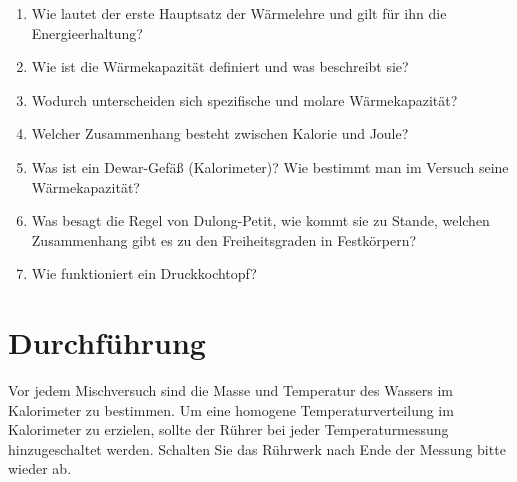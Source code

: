 \begin{enumerate} 
 \item Wie lautet der erste Hauptsatz der Wärmelehre und gilt für ihn die Energieerhaltung?
 \item Wie ist die Wärmekapazität definiert und was beschreibt sie?
 \item Wodurch unterscheiden sich spezifische und molare Wärmekapazität?
 \item Welcher Zusammenhang besteht zwischen Kalorie und Joule?
 \item Was ist ein Dewar-Gefäß (Kalorimeter)? Wie bestimmt man im Versuch seine Wärmekapazität?
 \item Was besagt die Regel von Dulong-Petit, wie kommt sie zu Stande, welchen Zusammenhang gibt es zu den Freiheitsgraden in Festkörpern?
 \item Wie funktioniert ein Druckkochtopf?
\end{enumerate} 

\section{Durchführung} 

Vor jedem Mischversuch sind die Masse und Temperatur des Wassers im Kalorimeter zu bestimmen. Um eine homogene Temperaturverteilung im Kalorimeter zu erzielen, sollte der Rührer bei jeder Temperaturmessung hinzugeschaltet werden. Schalten Sie das Rührwerk nach Ende der Messung bitte wieder ab.\\


